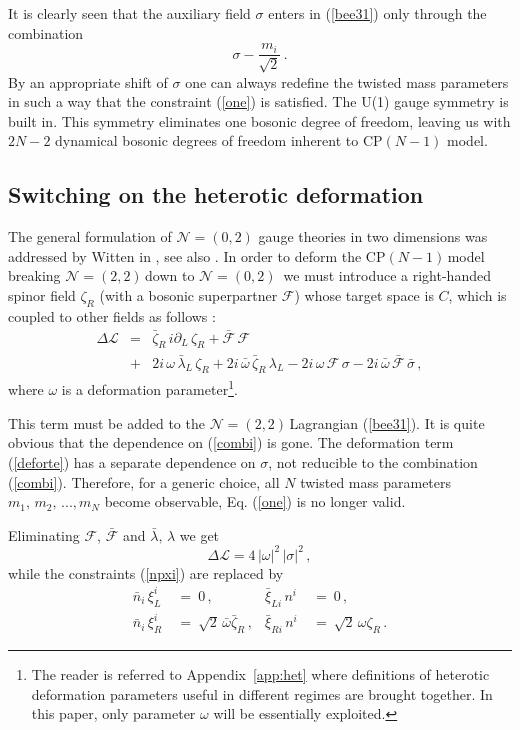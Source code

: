 \documentclass[epsfig,12pt]{article}
\def\beq{\begin{equation}}
\def\eeq{\end{equation}}
\def\beqn{\begin{eqnarray}}
\def\eeqn{\end{eqnarray}}
\newcommand{\ntt}{${\mathcal N}=(2,2)\,$}
\newcommand{\nzt}{${\mathcal N}=(0,2)\,$}
\newcommand{\cpn}{CP$(N-1)\,$}
\newcommand{\cell}{{\mathcal L}}
\newcommand{\pt}{\partial}
\newcommand{\cf}{${\mathcal F}$}
\newcommand{\cfe}{{\mathcal F}}
\def\beqn{\begin{eqnarray}}
\def\eeqn{\end{eqnarray}}
\def\beq{\begin{equation}}
\def\eeq{\end{equation}}
\newcommand{\ntwoo}{${\mathcal N}= \left(0,2\right) $ }
\begin{document}
It is clearly seen that the auxiliary field $\sigma$
enters in (\ref{bee31}) only through the  combination
\beq
\sigma -\frac{m_i}{\sqrt 2}\,.
\label{combi}
\eeq
By an appropriate shift of $\sigma$
one can always redefine the twisted mass parameters in such a way that the constraint
(\ref{one}) is satisfied.
The U(1) gauge symmetry is built in. This symmetry eliminates one bosonic degree of freedom, leaving us with $2N-2$ dynamical bosonic degrees of freedom inherent to CP$(N-1)$ model.

\subsection{Switching on the heterotic deformation}
\label{gfsothd}


The general formulation of \ntwoo gauge theories in two dimensions was addressed by Witten in 
\cite{W93}, see also \cite{Witten:2005px}.
In order to deform the \cpn model breaking \ntt down to \mbox{\nzt}
we must introduce a right-handed spinor field $\zeta_R$ (with a bosonic superpartner \cf)
whose  target space is $C$, which is coupled to other fields as follows
\cite{EdTo,SY1}:
\beqn
\Delta\cell 
&=&
\bar\zeta_R\, i\pt_L\, \zeta_R   +\bar\cfe\,\cfe
	\nonumber\\[2mm]
&+&
 2i\, \omega \, \bar\lambda_L\, \zeta_R +  2i\, \bar{\omega} \, \bar\zeta_R\, \lambda_L -
	 2i\, \omega \, \cfe\, \sigma -
 2i\, \bar{\omega} \, \bar\cfe\, \bar{\sigma}\,,
 \label{deforte}
\eeqn
where $\omega$ is a deformation parameter\footnote{The reader is referred to
Appendix~\ref{app:het} where definitions of heterotic deformation parameters useful in different regimes
are brought together. In this paper, only parameter $ \omega $ will be essentially exploited.}.

This term must be added to the \ntt Lagrangian (\ref{bee31}). 
It is quite obvious that the dependence on (\ref{combi}) is gone. 
The deformation term (\ref{deforte}) has a separate dependence on $\sigma$, not reducible to the
combination (\ref{combi}). Therefore, for a generic choice, all $N$ twisted mass
parameters $m_1,\,m_2,\, ..., m_N$ become observable, Eq. (\ref{one}) is no longer valid.

\vspace{1mm}

Eliminating \cf, $\bar\cfe$  and $\bar\lambda ,\,\lambda$ we get
\beq
\Delta\cell = 4\, |\omega |^2\,|\sigma |^2\,,
\label{deffpp}
\eeq
while the constraints (\ref{npxi}) are replaced by
\begin{align}
%
\bar{n}_i\,\xi^i_L & ~=~ 0\,,
& \bar\xi_{Li}\,n^i & ~=~ 0\,,
\nonumber\\[2mm]
%
\bar{n}_i\,\xi^i_R & ~=~  \sqrt{2}\,\bar\omega \bar\zeta_R\,,
& \bar\xi_{Ri}\,n^i  & ~=~  \sqrt{2}\,\omega \zeta_R\,.
\label{npxip}
\end{align}
\end{document}
